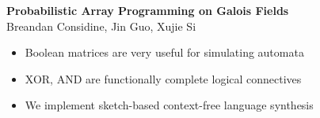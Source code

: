 \documentclass[portrait,a0b,final,a4resizeable]{a0poster}
\def\jointspacing{\vspace{0.3in}}
\begin{document}
  \begin{poster}
    \vspace{1\baselineskip}   %


    \begin{center}
      \begin{pcolumn}{1.03}
        \begin{minipage}[c][9cm][c]{0.85\textwidth}
          \begin{center}
          {\veryHuge \textbf{Probabilistic Array Programming on Galois Fields}}\\[10mm]
          {\huge Breandan Considine, Jin Guo, Xujie Si\\[7.5mm]
          }
          \end{center}
        \end{minipage}
      \end{pcolumn}
    \end{center}

    \vspace*{1.5cm}

    \large



    \Large

    \begin{multicols}{2}



      \vspace*{-1cm}
      \null\hspace*{3cm}\begin{minipage}[c]{0.85\columnwidth}
      \begin{itemize}
        \item Boolean matrices are very useful for simulating automata
        \item XOR, AND are functionally complete logical connectives
        \item We implement sketch-based context-free language synthesis
      \end{itemize}
      \end{minipage}

      \jointspacing

      \vspace*{-1cm}
      \null\hspace*{3cm}\begin{minipage}[c]{0.85\columnwidth}


\end{minipage}
\end{multicols}
\end{poster}
\end{document}
